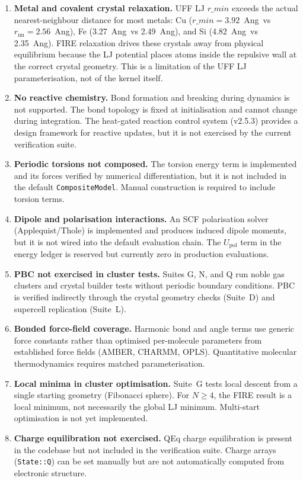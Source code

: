 \documentclass[11pt,twoside]{article}
\def\AA{Ang}%
\def\rmin{r\_min}%
\newcommand{\rmin}{r_{\mathrm{min}}}
\newcommand{\type}[1]{\texttt{#1}}
\newcommand{\field}[1]{\texttt{#1}}
\begin{document}
\begin{enumerate}
  \item \textbf{Metal and covalent crystal relaxation.} UFF LJ $\rmin$ exceeds the actual nearest-neighbour distance for most metals: Cu ($\rmin = 3.92$~\AA\ vs $r_{\mathrm{nn}} = 2.56$~\AA), Fe (3.27~\AA\ vs 2.49~\AA), and Si (4.82~\AA\ vs 2.35~\AA). FIRE relaxation drives these crystals away from physical equilibrium because the LJ potential places atoms inside the repulsive wall at the correct crystal geometry. This is a limitation of the UFF LJ parameterisation, not of the kernel itself.

  \item \textbf{No reactive chemistry.} Bond formation and breaking during dynamics is not supported. The bond topology is fixed at initialisation and cannot change during integration. The heat-gated reaction control system (v2.5.3) provides a design framework for reactive updates, but it is not exercised by the current verification suite.

  \item \textbf{Periodic torsions not composed.} The torsion energy term is implemented and its forces verified by numerical differentiation, but it is not included in the default \type{CompositeModel}. Manual construction is required to include torsion terms.

  \item \textbf{Dipole and polarisation interactions.} An SCF polarisation solver (Applequist/Thole) is implemented and produces induced dipole moments, but it is not wired into the default evaluation chain. The $U_{\mathrm{pol}}$ term in the energy ledger is reserved but currently zero in production evaluations.

  \item \textbf{PBC not exercised in cluster tests.} Suites G, N, and Q run noble gas clusters and crystal builder tests without periodic boundary conditions. PBC is verified indirectly through the crystal geometry checks (Suite~D) and supercell replication (Suite~L).

  \item \textbf{Bonded force-field coverage.} Harmonic bond and angle terms use generic force constants rather than optimised per-molecule parameters from established force fields (AMBER, CHARMM, OPLS). Quantitative molecular thermodynamics requires matched parameterisation.

  \item \textbf{Local minima in cluster optimisation.} Suite~G tests local descent from a single starting geometry (Fibonacci sphere). For $N \geq 4$, the FIRE result is a local minimum, not necessarily the global LJ minimum. Multi-start optimisation is not yet implemented.

  \item \textbf{Charge equilibration not exercised.} QEq charge equilibration is present in the codebase but not included in the verification suite. Charge arrays (\field{State::Q}) can be set manually but are not automatically computed from electronic structure.
\end{enumerate}
\end{document}
